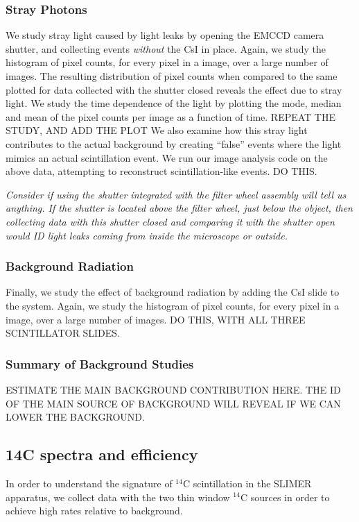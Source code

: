 \documentclass[11pt]{article}
\newcommand{\nuc}[2]{\ensuremath{^{#1}}#2}
\begin{document}
\subsubsection{Stray Photons}
We study stray light caused by light leaks by opening the EMCCD camera shutter, and collecting events \emph{without} the CsI in place. Again, we study the histogram of pixel counts, for every pixel in a image, over a large number of images. The resulting distribution of pixel counts when compared to the same plotted for data collected with the shutter closed reveals the effect due to stray light. We study the time dependence of the light by plotting the mode, median and mean of the pixel counts per image
as a function of time. REPEAT THE STUDY, AND ADD THE PLOT
We also examine how this stray light contributes to the actual background by creating ``false'' events where the light mimics an actual scintillation event.   We run our image analysis code on the above data, attempting to reconstruct scintillation-like events. DO THIS. 

\emph{Consider if using the shutter integrated with the filter wheel assembly will tell us anything. If the shutter is located above the filter wheel, just below the object, then collecting data with this shutter closed and comparing it with the shutter open would ID light leaks coming from inside the microscope or outside.}

\subsubsection{Background Radiation}
Finally, we study the effect of background radiation by adding the CsI slide to the system. Again, we study the histogram of pixel counts, for every pixel in a image, over a large number of images.
DO THIS, WITH ALL THREE SCINTILLATOR SLIDES. 

\subsubsection{Summary of Background Studies}
ESTIMATE THE MAIN BACKGROUND CONTRIBUTION HERE. THE ID OF THE MAIN SOURCE OF BACKGROUND WILL REVEAL IF WE CAN LOWER THE BACKGROUND.

\subsection{14C spectra and efficiency}%

In order to understand the signature of \nuc{14}{C} scintillation in the SLIMER apparatus, we collect data with the two thin window \nuc{14}{C} sources in order to achieve high rates relative to background. 
\end{document}
